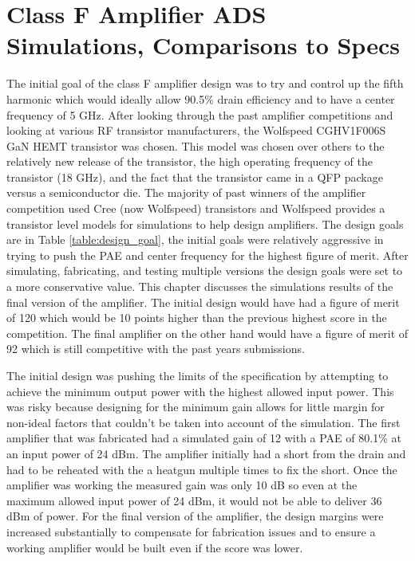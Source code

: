 \chapter{Class F Amplifier ADS Simulations, Comparisons to Specs}

The initial goal of the class F amplifier design was to try and control up the fifth harmonic which would ideally allow 90.5\% drain efficiency and to have a center frequency of 5 GHz. After looking through the past amplifier competitions and looking at various RF transistor manufacturers, the Wolfspeed CGHV1F006S GaN HEMT transistor was chosen. This model was chosen over others to the relatively new release of the transistor, the high operating frequency of the transistor (18 GHz), and the fact that the transistor came in a QFP package versus a semiconductor die. The majority of past winners of the amplifier competition used Cree (now Wolfspeed) transistors and Wolfspeed provides a transistor level models for simulations to help design amplifiers. The design goals are in Table \ref{table:design_goal}, the initial goals were relatively aggressive in trying to push the PAE and center frequency for the highest figure of merit. After simulating, fabricating, and testing multiple versions the design goals were set to a more conservative value. This chapter discusses the simulations results of the final version of the amplifier. The initial design would have had a figure of merit of 120 which would be 10 points higher than the previous highest score in the competition. The final amplifier on the other hand would have a figure of merit of 92 which is still competitive with the past years submissions.

The initial design was pushing the limits of the specification by attempting to achieve the minimum output power with the highest allowed input power. This was risky because designing for the minimum gain allows for little margin for non-ideal factors that couldn't be taken into account of the simulation. The first amplifier that was fabricated had a simulated gain of 12 with a PAE of 80.1\% at an input power of 24 dBm. The amplifier initially had a short from the drain and had to be reheated with the a heatgun multiple times to fix the short. Once the amplifier was working the measured gain was only 10 dB so even at the maximum allowed input power of 24 dBm, it would not be able to deliver 36 dBm of power. For the final version of the amplifier, the design margins were increased substantially to compensate for fabrication issues and to ensure a working amplifier would be built even if the score was lower.

